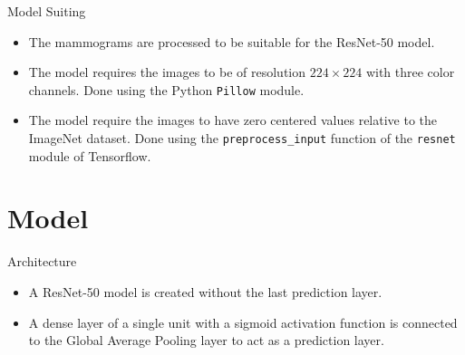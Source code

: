 \documentclass{beamer}
\begin{document}
\begin{frame}{Model Suiting}
  \begin{itemize}
    \item The mammograms are processed to be suitable for the ResNet-50 model.
    \item The model requires the images to be of resolution \alert{$224 \times
      224$} with three color channels. Done using the Python \texttt{Pillow}
      module.
    \item The model require the images to have zero centered values relative
      to the ImageNet dataset. Done using the \texttt{preprocess\_input}
      function of the \texttt{resnet} module of Tensorflow.
  \end{itemize}
\end{frame}

\section{Model}

\begin{frame}{Architecture}
  \begin{itemize}
    \item A ResNet-50 model is created without the last prediction layer.
    \item A dense layer of a single unit with a sigmoid activation function is
      connected to the \alert{Global Average Pooling} layer to act as a
      prediction layer.
  \end{itemize}
\end{frame}
\end{document}
